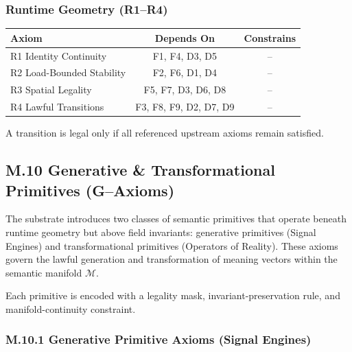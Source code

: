 \subsubsection*{Runtime Geometry (R1–R4)}

\begin{center}
\begin{tabular}{lcc}
\toprule
\textbf{Axiom} & \textbf{Depends On} & \textbf{Constrains} \\
\midrule
R1 Identity Continuity & F1, F4, D3, D5 & -- \\
R2 Load-Bounded Stability & F2, F6, D1, D4 & -- \\
R3 Spatial Legality & F5, F7, D3, D6, D8 & -- \\
R4 Lawful Transitions & F3, F8, F9, D2, D7, D9 & -- \\
\bottomrule
\end{tabular}
\end{center}

A transition is legal only if all referenced upstream axioms remain satisfied.

\subsection*{M.10 Generative & Transformational Primitives (G–Axioms)}

The substrate introduces two classes of semantic primitives that operate beneath
runtime geometry but above field invariants: generative primitives (Signal
Engines) and transformational primitives (Operators of Reality). These axioms
govern the lawful generation and transformation of meaning vectors within the
semantic manifold $\mathcal{M}$.

Each primitive is encoded with a legality mask, invariant-preservation rule, and
manifold-continuity constraint.


\subsubsection*{M.10.1 Generative Primitive Axioms (Signal Engines)}

